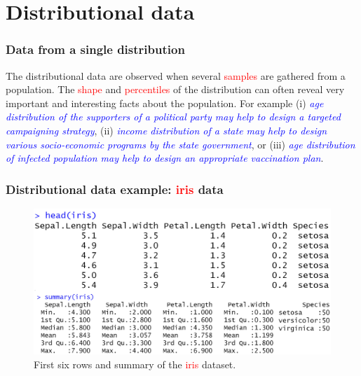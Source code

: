\documentclass{beamer}
\begin{document}
\section{Distributional data}
\begin{frame}\frametitle{Data from a single distribution}
The distributional data are observed when several \textcolor{red}{samples} are gathered from a population. The \textcolor{red}{shape} and \textcolor{red}{percentiles} of the distribution can often reveal very important and interesting facts about the population. For example (i) \textit{\textcolor{blue}{age distribution of the supporters of a political party may help to design a targeted campaigning strategy}}, (ii) \textit{\textcolor{blue}{income distribution of a state may help to design various socio-economic programs by the state government}}, or (iii) \textit{\textcolor{blue}{age distribution of infected population may help to design an appropriate vaccination plan}}.
\end{frame}

\begin{frame}\frametitle{Distributional data example: \textcolor{red}{iris} data}
\begin{figure}
\includegraphics[width=0.99\linewidth]{PlotsLec1/IrisSummary}
\caption{{\small First six rows and summary of the \textcolor{red}{iris} dataset}.}
\end{figure}
\end{frame}
\end{document}
